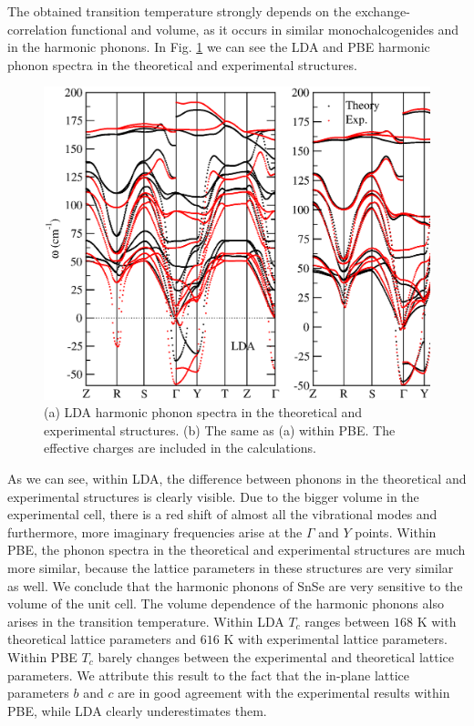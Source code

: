 The obtained transition temperature strongly depends on the exchange-correlation functional and volume, as it occurs 
in similar monochalcogenides\cite{ribeiro2018strong} and in the harmonic phonons.
In Fig. \ref{harmonic-volume} we can see the LDA and PBE harmonic phonon spectra in the theoretical and experimental 
structures.
\begin{figure}[th]
\begin{center}
\includegraphics[width=0.9\linewidth]{Figures/phonon-exp-dft.eps}
	\caption[Harmonic phonons of $Cmcm$ SnSe with different volumes.]{(a) LDA harmonic phonon spectra in the 
	theoretical and experimental structures. (b) The same as (a) within PBE. The effective charges are included 
	in the calculations.}
\label{harmonic-volume}
\end{center}
\end{figure}
As we can see, within LDA, the difference between phonons in the theoretical and experimental structures is clearly
visible. Due to the bigger volume in the experimental cell, there is a red shift of almost all the vibrational modes
and furthermore, more imaginary frequencies arise at the $\Gamma$ and $Y$ points. Within PBE, the phonon spectra in
the theoretical and experimental structures are much more similar, because the lattice parameters in these structures
are very similar as well. We conclude that the harmonic phonons of SnSe are very sensitive to the volume of the unit 
cell. The volume dependence of the harmonic phonons also arises in the transition temperature. Within LDA $T_{c}$ 
ranges between $168$ K with theoretical lattice parameters and $616$ K with experimental lattice parameters. Within 
PBE $T_{c}$ barely changes between the experimental and theoretical lattice parameters. We attribute this result to 
the fact that the in-plane lattice parameters $b$ and $c$ are in good agreement with the experimental results within 
PBE, while LDA clearly underestimates them. \\

